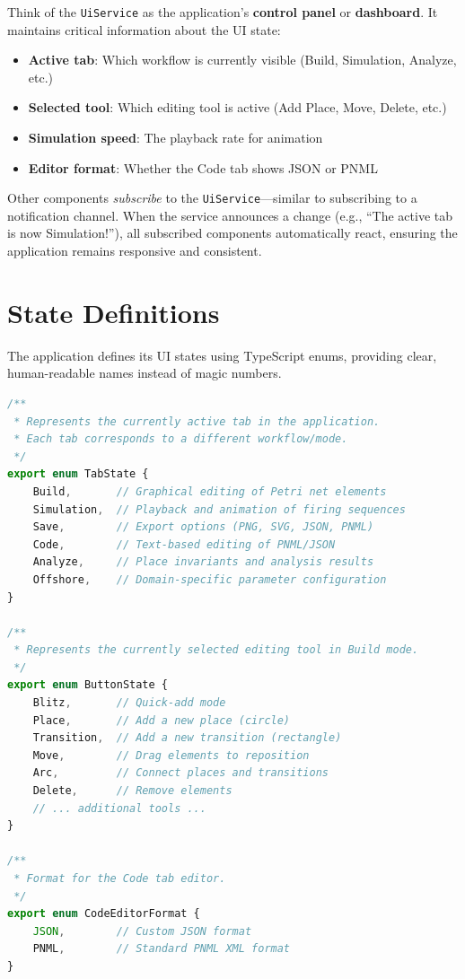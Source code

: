 Think of the \texttt{UiService} as the application's \textbf{control panel} or \textbf{dashboard}. It maintains critical information about the UI state:

\begin{itemize}
    \item \textbf{Active tab}: Which workflow is currently visible (Build, Simulation, Analyze, etc.)
    \item \textbf{Selected tool}: Which editing tool is active (Add Place, Move, Delete, etc.)
    \item \textbf{Simulation speed}: The playback rate for animation
    \item \textbf{Editor format}: Whether the Code tab shows JSON or PNML
\end{itemize}

Other components \textit{subscribe} to the \texttt{UiService}---similar to subscribing to a notification channel. When the service announces a change (e.g., ``The active tab is now Simulation!''), all subscribed components automatically react, ensuring the application remains responsive and consistent.

\section{State Definitions}
\label{sec:ui-states}

The application defines its UI states using TypeScript enums, providing clear, human-readable names instead of magic numbers.

\begin{lstlisting}[language=TypeScript, caption={UI state enums (src/app/tr-enums/ui-state.ts)}]
/**
 * Represents the currently active tab in the application.
 * Each tab corresponds to a different workflow/mode.
 */
export enum TabState {
    Build,       // Graphical editing of Petri net elements
    Simulation,  // Playback and animation of firing sequences
    Save,        // Export options (PNG, SVG, JSON, PNML)
    Code,        // Text-based editing of PNML/JSON
    Analyze,     // Place invariants and analysis results
    Offshore,    // Domain-specific parameter configuration
}

/**
 * Represents the currently selected editing tool in Build mode.
 */
export enum ButtonState {
    Blitz,       // Quick-add mode
    Place,       // Add a new place (circle)
    Transition,  // Add a new transition (rectangle)
    Move,        // Drag elements to reposition
    Arc,         // Connect places and transitions
    Delete,      // Remove elements
    // ... additional tools ...
}

/**
 * Format for the Code tab editor.
 */
export enum CodeEditorFormat {
    JSON,        // Custom JSON format
    PNML,        // Standard PNML XML format
}
\end{lstlisting}

